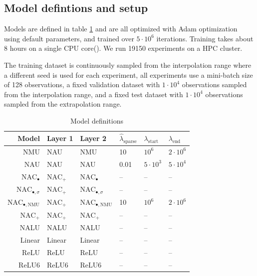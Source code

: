 \subsection{Model defintions and setup}

Models are defined in table \ref{tab:simple-function-task-model-defintions} and are all optimized with Adam optimization \cite{adam-optimization} using default parameters, and trained over $5 \cdot 10^6$ iterations. Training takes about 8 hours on a single CPU core(). We run 19150 experiments on a HPC cluster.

The training dataset is continuously sampled from the interpolation range where a different seed is used for each experiment, all experiments use a mini-batch size of 128 observations, a fixed validation dataset with $1 \cdot 10^4$ observations sampled from the interpolation range, and a fixed test dataset with $1 \cdot 10^4$ observations sampled from the extrapolation range.

\begin{table}[h]
\caption{Model definitions}
\label{tab:simple-function-task-model-defintions}
\centering
\begin{tabular}{r l l l l l}
\toprule
 Model & Layer 1 & Layer 2 & $\hat{\lambda}_{\mathrm{sparse}}$ & $\lambda_{\mathrm{start}}$ & $\lambda_{\mathrm{end}}$ \\
 \midrule
 NMU & NAU & NMU & 10 & $10^6$ & $2 \cdot 10^6$ \\
 NAU & NAU & NAU & 0.01 & $5 \cdot 10^3$ & $5 \cdot 10^4$ \\
 $\mathrm{NAC}_{\bullet}$ & $\mathrm{NAC}_{+}$ & $\mathrm{NAC}_{\bullet}$ & -- & -- & -- \\
 $\mathrm{NAC}_{\bullet,\sigma}$ & $\mathrm{NAC}_{+}$ & $\mathrm{NAC}_{\bullet,\sigma}$ & -- & -- & -- \\
 $\mathrm{NAC}_{\bullet,\mathrm{NMU}}$ & $\mathrm{NAC}_{+}$ & $\mathrm{NAC}_{\bullet,\mathrm{NMU}}$ & 10 & $10^6$ & $2 \cdot 10^6$ \\
 $\mathrm{NAC}_{+}$ & $\mathrm{NAC}_{+}$ & $\mathrm{NAC}_{+}$ & -- & -- & -- \\
 NALU & NALU & NALU & -- & -- & -- \\
 Linear & Linear & Linear & -- & -- & -- \\
 ReLU & ReLU & ReLU & -- & -- & -- \\
 ReLU6 & ReLU6 & ReLU6 & -- & -- & -- \\
 \bottomrule
\end{tabular}
\end{table}

